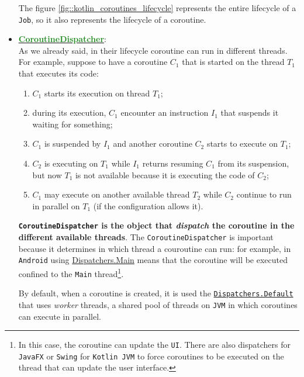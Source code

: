 \begin{itemize}
	The figure \ref{fig::kotlin_coroutines_lifecycle} represents the entire lifecycle of a \texttt{Job}, so it also represents the lifecycle of a \Kotlin coroutine.
	
	\item \href{https://kotlinlang.org/api/kotlinx.coroutines/kotlinx-coroutines-core/kotlinx.coroutines/-coroutine-dispatcher/}{\underline{\textbf{\textcolor{ForestGreen}{CoroutineDispatcher}}}}:\\
	As we already said, in their lifecycle coroutine can run in different threads. For example, suppose to have a coroutine $C_1$ that is started on the thread $T_1$ that executes its code:
	\begin{enumerate}
		\item $C_1$ starts its execution on thread $T_1$;
		\item during its execution, $C_1$ encounter an instruction $I_1$ that suspends it waiting for something;
		\item $C_1$ is suspended by $I_1$ and another coroutine $C_2$ starts to execute on $T_1$;
		\item $C_2$ is executing on $T_1$ while $I_1$ returns resuming $C_1$ from its suspension, but now $T_1$ is not available because it is executing the code of $C_2$;
		\item $C_1$ may execute on another available thread $T_2$ while $C_2$ continue to run in parallel on $T_1$ (if the configuration allows it).
	\end{enumerate}
	\textbf{\texttt{CoroutineDispatcher} is the object that \textit{dispatch} the coroutine in the different available threads}. The \texttt{CoroutineDispatcher} is important because it determines in which thread a couroutine can run: for example, in \texttt{Android} using \href{https://kotlinlang.org/api/kotlinx.coroutines/kotlinx-coroutines-core/kotlinx.coroutines/-dispatchers/-main.html}{Dispatchers.Main} means that the coroutine will be executed confined to the \texttt{Main} thread\footnote{In this case, the coroutine can update the \texttt{UI}. There are also dispatchers for \texttt{JavaFX} or \texttt{Swing} for \texttt{Kotlin JVM} to force coroutines to be executed on the thread that can update the user interface.}.
	
	By default, when a coroutine is created, it is used the \href{https://kotlinlang.org/api/kotlinx.coroutines/kotlinx-coroutines-core/kotlinx.coroutines/-dispatchers/-default.html}{\texttt{Dispatchers.Default}} that uses \textit{worker} threads, a shared pool of threads on \texttt{JVM} in which coroutines can execute in parallel. 
	

\end{itemize}
